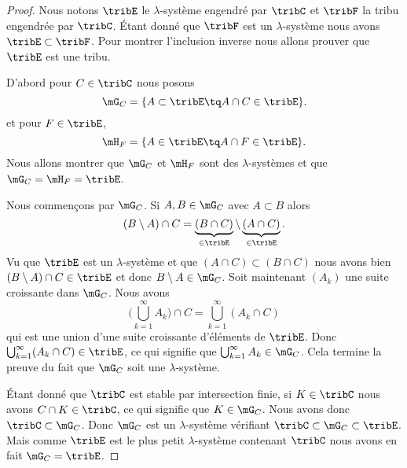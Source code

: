 \begin{proof}
    Nous notons \( \tribE\) le \( \lambda\)-système engendré par \( \tribC\) et \( \tribF\) la tribu engendrée par \( \tribC\). Étant donné que \( \tribF\) est un \( \lambda\)-système nous avons \( \tribE\subset\tribF\). Pour montrer l'inclusion inverse nous allons prouver que \( \tribE\) est une tribu.

    D'abord pour \( C\in\tribC\) nous posons
    \begin{equation}
        \mG_C=\{ A\subset \tribE\tq A\cap C\in\tribE \}.
    \end{equation}
    et pour \( F\in\tribE\),
    \begin{equation}
        \mH_F=\{ A\in\tribE\tq A\cap F\in\tribE \}.
    \end{equation}
    Nous allons montrer que \( \mG_C\) et \( \mH_F\) sont des \( \lambda\)-systèmes et que \( \mG_C=\mH_F=\tribE\).
    
    Nous commençons par \( \mG_C\). Si \( A,B\in\mG_C\) avec \( A\subset B\) alors
    \begin{equation}
        (B\setminus A)\cap C=\underbrace{(B\cap C)}_{\in\tribE}\setminus\underbrace{(A\cap C)}_{\in\tribE}.
    \end{equation}
    Vu que \( \tribE\) est un \( \lambda\)-système et que \( (A\cap C)\subset(B\cap C)\) nous avons bien \( (B\setminus A)\cap C\in\tribE\) et donc \( B\setminus A\in\mG_C\). Soit maintenant \( (A_k)\) une suite croissante dans \( \mG_C\). Nous avons
    \begin{equation}
        \big( \bigcup_{k=1}^{\infty}A_k \big)\cap C=\bigcup_{k=1}^{\infty}(A_k\cap C)
    \end{equation}
    qui est une union d'une suite croissante d'éléments de \( \tribE\). Donc \( \bigcup_{k=1}^{\infty}(A_k\cap C)\in\tribE\), ce qui signifie que \( \bigcup_{k=1}^{\infty}A_k\in\mG_C\). Cela termine la preuve du fait que \( \mG_C\) soit une \( \lambda\)-système. 

    Étant donné que \( \tribC\) est stable par intersection finie, si \( K\in\tribC\) nous avons \( C\cap K\in\tribC\), ce qui signifie que \( K\in\mG_C\). Nous avons donc \( \tribC\subset\mG_C\). Donc \( \mG_C\) est un \( \lambda\)-système vérifiant \( \tribC\subset\mG_C\subset\tribE\). Mais comme \( \tribE\) est le plus petit \( \lambda\)-système contenant \( \tribC\) nous avons en fait \( \mG_C=\tribE\).


\end{proof}
